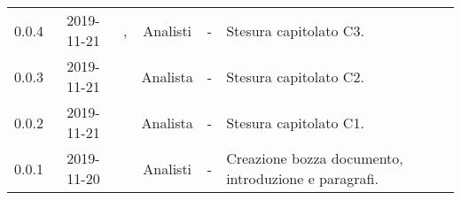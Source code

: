 {\begin{longtable}{ c c  C{2.5cm} c c C{3.5cm}}
0.0.4 & 2019-11-21 & \LD{}, \CE{} & Analisti & - & Stesura capitolato C3. \\

0.0.3 & 2019-11-21 & \AT{} & Analista & - & Stesura capitolato C2. \\

0.0.2 & 2019-11-21 & \PF{} & Analista & - & Stesura capitolato C1. \\
		
0.0.1 & 2019-11-20 & \Gruppo{} & Analisti & - & Creazione bozza documento, introduzione e paragrafi. \\
		
\end{longtable}
}
